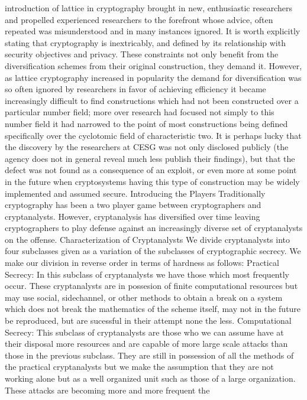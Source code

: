 introduction of lattice in cryptography brought in new, enthusiastic
researchers and propelled experienced researchers to the forefront
whose advice, often repeated was misunderstood and in many instances
ignored. It is worth explicitly stating that cryptography is
inextricably, and defined by its relationship with security objectives
and privacy. These constraints not only benefit from the
diversification schemes from their original construction, they demand
it. However, as lattice cryptography increased in popularity the demand
for diversification was so often ignored by researchers in favor of
achieving efficiency it became increasingly difficult to find
constructions which had not been constructed over a particular number
field; more over research had focused not simply to this number field
it had narrowed to the point of most constructions being defined
specifically over the cyclotomic field of characteristic two. It is
perhaps lucky that the discovery by the researchers at CESG was not
only disclosed publicly (the agency does not in general reveal much
less publish their findings), but that the defect was not found as a
consequence of an exploit, or even more at some point in the future
when cryptosystems having this type of construction may be widely
implemented and assumed secure. Introducing the Players Traditionally
cryptography has been a two player game between cryptographers and
cryptanalysts. However, cryptanalysis has diversified over time leaving
cryptographers to play defense against an increasingly diverse set of
cryptanalysts on the offense. Characterization of Cryptanalysts We
divide cryptanalysts into four subclasses given as a variation of the
subclasses of cryptographic secrecy. We make our division in reverse
order in terms of hardness as follows: Practical Secrecy: In this
subclass of cryptanalysts we have those which most frequently occur.
These cryptanalysts are in possesion of finite computational resources
but may use social, sidechannel, or other methods to obtain a break on
a system which does not break the mathematics of the scheme itself, may
not in the future be reproduced, but are sucessful in their attempt
none the less. Computational Secrecy: This subclass of cryptanalysts
are those who we can assume have at their disposal more resources and
are capable of more large scale attacks than those in the previous
subclass. They are still in possession of all the methods of the
practical cryptanalysts but we make the assumption that they are not
working alone but as a well organized unit such as those of a large
organization. These attacks are becoming more and more frequent the
